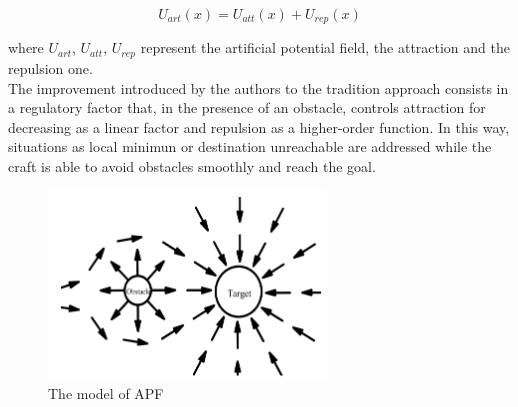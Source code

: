 \documentclass[12pt]{article}
\begin{document}
                  \begin{equation} \label{eq:apf}
                         U_{art}(x) = U_{att}(x) + U_{rep}(x)
                  \end{equation}

              where $U_{art}$, $U_{att}$, $U_{rep}$ represent the artificial potential field, the attraction and the repulsion one.\\
              The improvement introduced by the authors to the tradition approach consists in a regulatory factor that, in the presence of an obstacle, controls attraction for decreasing as a linear factor and repulsion as a higher-order function. In this way, situations as local minimun or destination unreachable are addressed while the craft is able to avoid obstacles smoothly and reach the goal.

              \begin{figure}
                    \centering
                    \includegraphics[height=5cm]{./Images/Xie/apf}
                    \caption{The model of APF}
                    \label{fig:apf}
              \end{figure}
\end{document}
